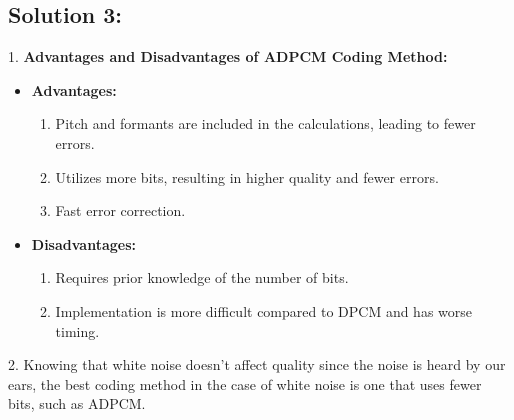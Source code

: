 \documentclass[letterpaper, 12pt]{article}
\begin{document}
\subsection*{Solution 3:}
1. \textbf{Advantages and Disadvantages of ADPCM Coding Method:}
   \begin{itemize}
       \item \textbf{Advantages:}
       \begin{enumerate}
           \item Pitch and formants are included in the calculations, leading to fewer errors.
           \item Utilizes more bits, resulting in higher quality and fewer errors.
           \item Fast error correction.
       \end{enumerate}
       \item \textbf{Disadvantages:}
       \begin{enumerate}
           \item Requires prior knowledge of the number of bits.
           \item Implementation is more difficult compared to DPCM and has worse timing.
       \end{enumerate}
   \end{itemize}

2. Knowing that white noise doesn't affect quality since the noise is heard by our ears, the best coding method in the case of white noise is one that uses fewer bits, such as ADPCM.
\end{document}
